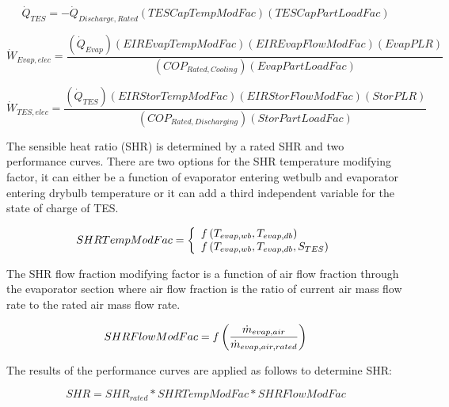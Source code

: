 \begin{equation}
{\dot Q_{TES}} =  - {\dot Q_{Discharge,Rated}}\left( {TESCapTempModFac} \right)\left( {TESCapPartLoadFac} \right)
\end{equation}

\begin{equation}
{\dot W_{Evap,elec}} = \frac{{\left( {{{\dot Q}_{Evap}}} \right)\left( {EIREvapTempModFac} \right)\left( {EIREvapFlowModFac} \right)\left( {EvapPLR} \right)}}{{\left( {CO{P_{Rated,Cooling}}} \right)\left( {EvapPartLoadFac} \right)}}
\end{equation}

\begin{equation}
{\dot W_{TES,elec}} = \frac{{\left( {{{\dot Q}_{TES}}} \right)\left( {EIRStorTempModFac} \right)\left( {EIRStorFlowModFac} \right)\left( {StorPLR} \right)}}{{\left( {CO{P_{Rated,Discharging}}} \right)\left( {StorPartLoadFac} \right)}}
\end{equation}

The sensible heat ratio (SHR) is determined by a rated SHR and two performance curves. There are two options for the SHR temperature modifying factor, it can either be a function of evaporator entering wetbulb and evaporator entering drybulb temperature or it can add a third independent variable for the state of charge of TES.

\begin{equation}
  SHRTempModFac = \left\{
    \begin{array}{l}
      f\left(T_{evap,wb},T_{evap,db}\right) \\
      f\left(T_{evap,wb},T_{evap,db},S_{TES}\right)
    \end{array}
  \right.
\end{equation}

The SHR flow fraction modifying factor is a function of air flow fraction through the evaporator section where air flow fraction is the ratio of current air mass flow rate to the rated air mass flow rate.

\begin{equation}
SHRFlowModFac = f\left(\frac{\dot{m}_{evap,air}}{\dot{m}_{evap,air,rated}}\right)
\end{equation}

The results of the performance curves are applied as follows to determine SHR:

\begin{equation}
SHR = SH{R_{rated}}*SHRTempModFac*SHRFlowModFac
\end{equation}

